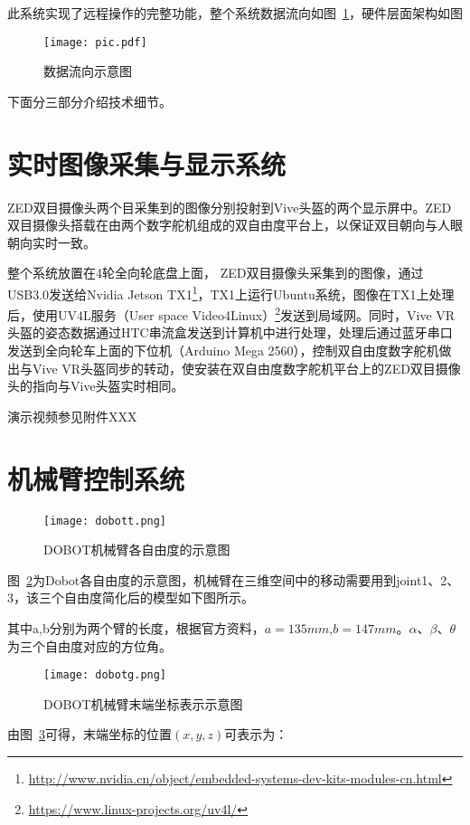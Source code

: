 此系统实现了远程操作的完整功能，整个系统数据流向如图~\ref{pic}，硬件层面架构如图
\begin{figure}[htbp]
\small
\centering
\texttt{[image: pic.pdf]}
\caption{数据流向示意图} 
\label{pic}
\end{figure}

下面分三部分介绍技术细节。

\section{实时图像采集与显示系统}
ZED双目摄像头两个目采集到的图像分别投射到Vive头盔的两个显示屏中。ZED双目摄像头搭载在由两个数字舵机组成的双自由度平台上，以保证双目朝向与人眼朝向实时一致。

整个系统放置在4轮全向轮底盘上面， ZED双目摄像头采集到的图像，通过USB3.0发送给Nvidia Jetson TX1\footnote{\url{http://www.nvidia.cn/object/embedded-systems-dev-kits-modules-cn.html}}，TX1上运行Ubuntu系统，图像在TX1上处理后，使用UV4L服务（User space Video4Linux）\footnote{\url{https://www.linux-projects.org/uv4l/}}发送到局域网。同时，Vive VR头盔的姿态数据通过HTC串流盒发送到计算机中进行处理，处理后通过蓝牙串口发送到全向轮车上面的下位机（Arduino Mega 2560），控制双自由度数字舵机做出与Vive VR头盔同步的转动，使安装在双自由度数字舵机平台上的ZED双目摄像头的指向与Vive头盔实时相同。


演示视频参见附件XXX


\section{机械臂控制系统}

\begin{figure}[htbp]
\small
\centering
\texttt{[image: dobott.png]}
\caption{DOBOT机械臂各自由度的示意图} 
\label{dobott}
\end{figure}

图~\ref{dobott}为Dobot各自由度的示意图，机械臂在三维空间中的移动需要用到joint1、2、3，该三个自由度简化后的模型如下图所示。

其中a,b分别为两个臂的长度，根据官方资料，$a=135mm$,$b=147mm$。$\alpha$、$\beta$、$\theta$ 为三个自由度对应的方位角。

\begin{figure}[htbp]
\small
\centering
\texttt{[image: dobotg.png]}
\caption{DOBOT机械臂末端坐标表示示意图} 
\label{dobotg}
\end{figure}

由图~\ref{dobotg}可得，末端坐标的位置$(x,y,z)$可表示为：

